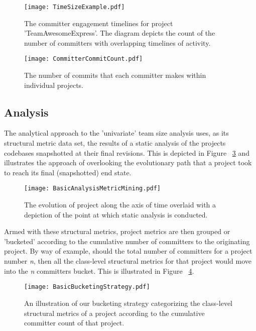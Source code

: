 \begin{figure}[htbp!] 
\centering    
\texttt{[image: TimeSizeExample.pdf]}
\caption[The committer engagement timelines for project 'TeamAwesomeExpress'.]{The committer engagement timelines for project 'TeamAwesomeExpress'. The diagram depicts the count of the number of committers with overlapping timelines of activity.}
\label{fig:TeamSizeExample}
\end{figure}

\begin{figure}[htbp!] 
\centering    
\texttt{[image: CommitterCommitCount.pdf]}
\caption{The number of commits that each committer makes within individual projects.}
\label{fig:CommitterCommitCount}
\end{figure}

\subsection{Analysis}
The analytical approach to the 'univariate' team size analysis uses, as its structural metric data set, the results of a static analysis of the projects codebases snapshotted at their final revisions. This is depicted in Figure ~\ref{fig:BasicAnalysisMetricMining} and illustrates the approach of overlooking the evolutionary path that a project took to reach its final (snapshotted) end state.

\begin{figure}[htbp!] 
\centering    
\texttt{[image: BasicAnalysisMetricMining.pdf]}
\caption{The evolution of project along the axis of time overlaid with a depiction of the point at which static analysis is conducted.}
\label{fig:BasicAnalysisMetricMining}
\end{figure}

Armed with these structural metrics, project metrics are then grouped or 'bucketed' according to the cumulative number of committers to the originating project. By way of example, should the total number of committers for a project number \textit{n}, then all the class-level structural metrics for that project would move into the \textit{n} committers bucket. This is illustrated in Figure ~\ref{fig:BasicBucketingStrategy}.
 
\begin{figure}[htbp!] 
\centering    
\texttt{[image: BasicBucketingStrategy.pdf]}
\caption{An illustration of our bucketing strategy categorizing the class-level structural metrics of a project according to the cumulative committer count of that project.}
\label{fig:BasicBucketingStrategy}
\end{figure}

